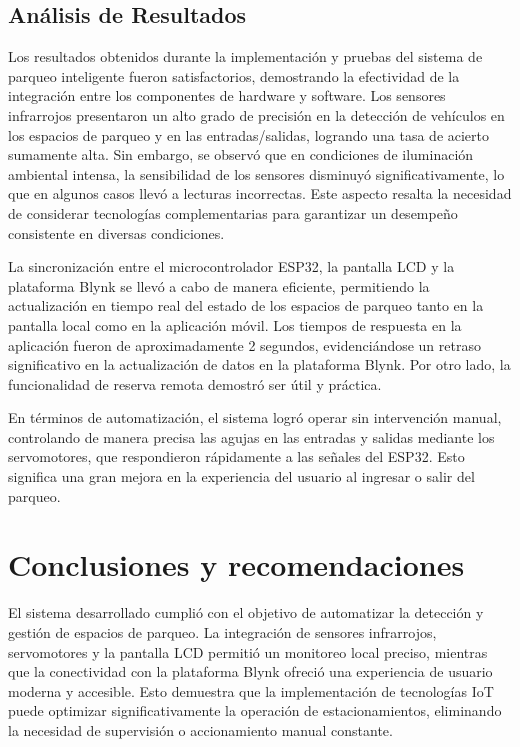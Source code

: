 \documentclass[12pt,a4paper]{article}
\begin{document}
\subsection{Análisis de Resultados}
Los resultados obtenidos durante la implementación y pruebas del sistema de parqueo inteligente fueron satisfactorios, demostrando la efectividad de la integración entre los componentes de hardware y software. Los sensores infrarrojos presentaron un alto grado de precisión en la detección de vehículos en los espacios de parqueo y en las entradas/salidas, logrando una tasa de acierto sumamente alta. Sin embargo, se observó que en condiciones de iluminación ambiental intensa, la sensibilidad de los sensores disminuyó significativamente, lo que en algunos casos llevó a lecturas incorrectas. Este aspecto resalta la necesidad de considerar tecnologías complementarias para garantizar un desempeño consistente en diversas condiciones.

La sincronización entre el microcontrolador ESP32, la pantalla LCD y la plataforma Blynk se llevó a cabo de manera eficiente, permitiendo la actualización en tiempo real del estado de los espacios de parqueo tanto en la pantalla local como en la aplicación móvil. Los tiempos de respuesta en la aplicación fueron de aproximadamente 2 segundos, evidenciándose un retraso significativo en la actualización de datos en la plataforma Blynk. Por otro lado, la funcionalidad de reserva remota demostró ser útil y práctica.

En términos de automatización, el sistema logró operar sin intervención manual, controlando de manera precisa las agujas en las entradas y salidas mediante los servomotores, que respondieron rápidamente a las señales del ESP32. Esto significa una gran mejora en la experiencia del usuario al ingresar o salir del parqueo.

\section{Conclusiones y recomendaciones}

El sistema desarrollado cumplió con el objetivo de automatizar la detección y gestión de espacios de parqueo. La integración de sensores infrarrojos, servomotores y la pantalla LCD permitió un monitoreo local preciso, mientras que la conectividad con la plataforma Blynk ofreció una experiencia de usuario moderna y accesible. Esto demuestra que la implementación de tecnologías IoT puede optimizar significativamente la operación de estacionamientos, eliminando la necesidad de supervisión o accionamiento manual constante.
\end{document}
